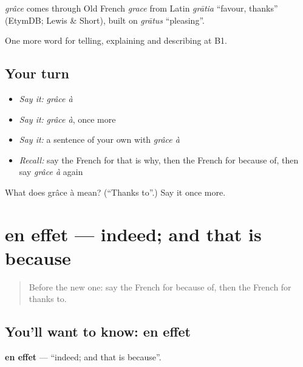 \begin{cousinweb}
\emph{grâce} comes through Old French \emph{grace} from Latin \emph{grātia} \textquotedblleft{}favour, thanks\textquotedblright{} (EtymDB; Lewis \& Short), built on \emph{grātus} \textquotedblleft{}pleasing\textquotedblright{}.
\end{cousinweb}

\begin{grammarlens}[title={What you've built}]
One more word for telling, explaining and describing at B1.
\end{grammarlens}

\subsection*{Your turn}
\begin{itemize}
\raggedright
  \item \emph{Say it:} \emph{grâce à}
  \item \emph{Say it:} \emph{grâce à}, once more
  \item \emph{Say it:} a sentence of your own with \emph{grâce à}
  \item \emph{Recall:} say the French for that is why, then the French for because of, then say \emph{grâce à} again
\end{itemize}

\begin{tcolorbox}[breakable,colback=teal!4,colframe=teal!35!black,title={Before you move on}]
What does grâce à mean? (\textquotedblleft{}Thanks to\textquotedblright{}.) Say it once more.
\end{tcolorbox}
\section[en effet]{en effet — indeed; and that is because}

\label{lesson:FR-C348-en-effet}



\begin{quote}
Before the new one: say the French for because of, then the French for thanks to.
\end{quote}

\subsection*{You'll want to know: en effet}
\textbf{en effet} — \textquotedblleft{}indeed; and that is because\textquotedblright{}.

